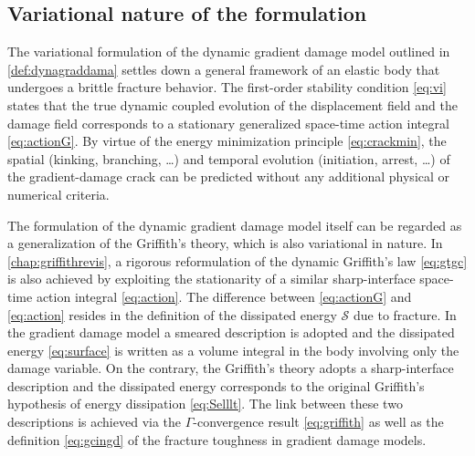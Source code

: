 \subsection{Variational nature of the formulation}
The variational formulation of the dynamic gradient damage model outlined in \cref{def:dynagraddama} settles down a general framework of an elastic body that undergoes a brittle fracture behavior. The first-order stability condition \cref{eq:vi} states that the true dynamic coupled evolution of the displacement field and the damage field corresponds to a stationary generalized space-time action integral \eqref{eq:actionG}. By virtue of the energy minimization principle \eqref{eq:crackmin}, the spatial (kinking, branching, \ldots) and temporal evolution (initiation, arrest, \ldots) of the gradient-damage crack can be predicted without any additional physical or numerical criteria.

The formulation of the dynamic gradient damage model itself can be regarded as a generalization of the Griffith's theory, which is also variational in nature. In \cref{chap:griffithrevis}, a rigorous reformulation of the dynamic Griffith's law \eqref{eq:gtgc} is also achieved by exploiting the stationarity of a similar sharp-interface space-time action integral \eqref{eq:action}. The difference between \eqref{eq:actionG} and \eqref{eq:action} resides in the definition of the dissipated energy $\mathcal{S}$ due to fracture. In the gradient damage model a smeared description is adopted and the dissipated energy \eqref{eq:surface} is written as a volume integral in the body involving only the damage variable. On the contrary, the Griffith's theory adopts a sharp-interface description and the dissipated energy corresponds to the original Griffith's hypothesis of energy dissipation \eqref{eq:Selllt}. The link between these two descriptions is achieved via the $\Gamma$-convergence result \eqref{eq:griffith} as well as the definition \eqref{eq:gcingd} of the fracture toughness in gradient damage models.

